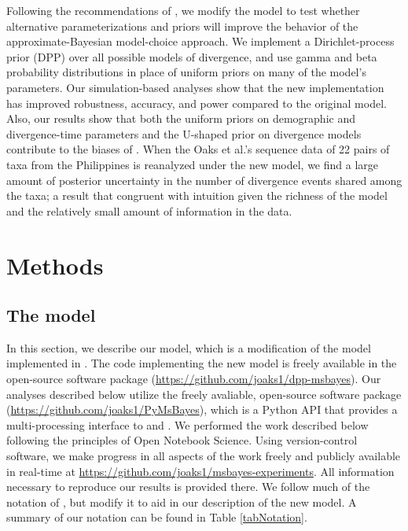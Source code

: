 Following the recommendations of \citet{Oaks2012}, we modify the \msb model to
test whether alternative parameterizations and priors will improve the behavior
of the approximate-Bayesian model-choice approach.
We implement a Dirichlet-process prior (DPP) over all possible models of
divergence, and use gamma and beta probability distributions in place of
uniform priors on many of the model's parameters.
Our simulation-based analyses show that the new implementation has improved
robustness, accuracy, and power compared to the original model.
Also, our results show that both the uniform priors on demographic and
divergence-time parameters and the U-shaped prior on divergence models
contribute to the biases of \msb.
When the Oaks et al.'s \citeyear{Oaks2012} sequence data of 22 pairs of taxa
from the Philippines is reanalyzed under the new model, we find a large amount
of posterior uncertainty in the number of divergence events shared among the
taxa; a result that congruent with intuition given the richness of the model
and the relatively small amount of information in the data.


\section*{Methods}

\subsection*{The model}
In this section, we describe our model, which is a modification of the model
implemented in \msb \citep{Huang2011,Oaks2012}.
The code implementing the new model is freely available in the open-source
software package \dppmsbayes
(\href{https://github.com/joaks1/dpp-msbayes}{https://github.com/joaks1/dpp-msbayes}).
Our analyses described below utilize the freely avaliable, open-source software
package \pymsbayes (\href{https://github.com/joaks1/PyMsBayes}{https://github.com/joaks1/PyMsBayes}),
which is a Python API that provides a multi-processing interface to \msb and
\dppmsbayes.
We performed the work described below following the principles of
Open Notebook Science.
Using version-control software, we make progress in all aspects of the work
freely and publicly available in real-time at
\href{https://github.com/joaks1/msbayes-experiments}{https://github.com/joaks1/msbayes-experiments}.
All information necessary to reproduce our results is provided there.
We follow much of the notation of \citet{Oaks2012}, but modify it to
aid in our description of the new model.
A summary of our notation can be found in Table \ref{tabNotation}.

